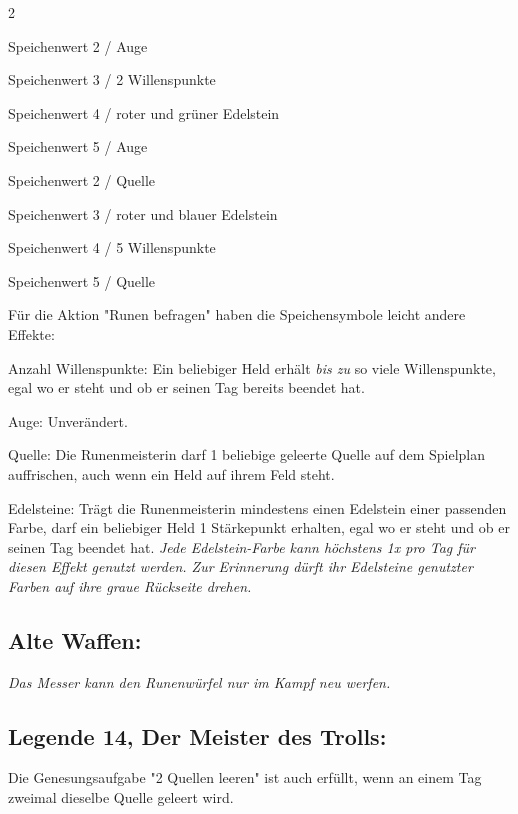 \documentclass[10pt, a4paper, oneside]{book}
\newcommand{\fan}[1]{\textit{#1}}
\begin{document}
\begin{multicols*}{2}
\begin{bgcolor}
\bullet{} Speichenwert 2 / Auge

\bullet{} Speichenwert 3 / 2 Willenspunkte

\bullet{} Speichenwert 4 / roter und grüner Edelstein

\bullet{} Speichenwert 5 / Auge

\bullet{} Speichenwert 2 / Quelle

\bullet{} Speichenwert 3 / roter und blauer Edelstein

\bullet{} Speichenwert 4 / 5 Willenspunkte

\bullet{} Speichenwert 5 / Quelle

Für die Aktion "Runen befragen" haben die Speichensymbole leicht andere Effekte:

\bullet{} Anzahl Willenspunkte: Ein beliebiger\supercite{mh11-heldenkarte-runenmeisterin} Held erhält \fan{bis zu} so viele Willenspunkte, egal wo er steht und ob er seinen Tag bereits beendet hat.

\bullet{} Auge: Unverändert.

\bullet{} Quelle: Die Runenmeisterin darf 1 beliebige geleerte Quelle auf dem Spielplan auffrischen, auch wenn ein Held auf ihrem Feld steht.

\bullet{} Edelsteine: Trägt die Runenmeisterin mindestens einen Edelstein einer passenden Farbe, darf ein beliebiger\supercite{mh11-heldenkarte-runenmeisterin} Held 1 Stärkepunkt erhalten, egal wo er steht und ob er seinen Tag beendet hat. \fan{Jede Edelstein-Farbe kann höchstens 1x pro Tag für diesen Effekt genutzt werden. Zur Erinnerung dürft ihr Edelsteine genutzter Farben auf ihre graue Rückseite drehen.}
\supercite{98910}


\subsection{Alte Waffen:}

\fan{Das Messer kann den Runenwürfel nur im Kampf neu werfen.}


\subsection{Legende 14, Der Meister des Trolls:}

Die Genesungsaufgabe "2 Quellen leeren" ist auch erfüllt, wenn an einem Tag zweimal dieselbe Quelle geleert wird.
\supercite{94130}


\end{bgcolor}





\end{multicols*}
\end{document}
